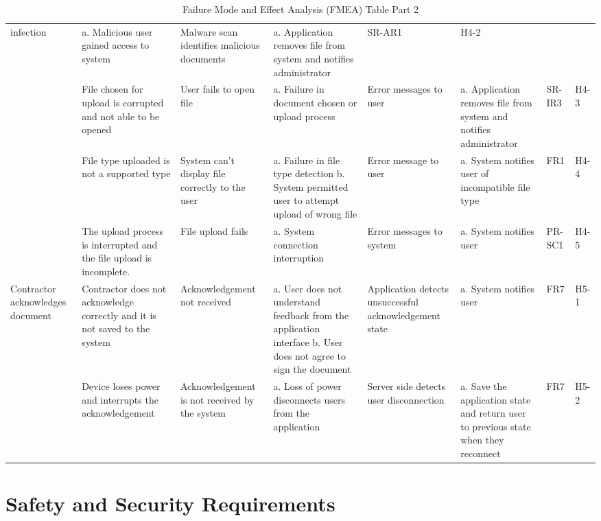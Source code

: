 \documentclass{article}
\begin{document}
\begin{table}[H]
{\begin{tabular}{|>{\raggedright}p{2.0cm}|>{\raggedright}p{2.0cm}|>{\raggedright}p{2.6cm}|>{\raggedright}p{4cm}|>{\raggedright}p{3cm}|>{\raggedright}p{4cm}|>{\raggedright}p{1.5cm}|p{1.5cm}|}
      infection &a. Malicious user gained access to system & Malware
      scan identifies malicious documents
      & a. Application removes file from system and notifies
      administrator & SR-AR1
      & H4-2 \\
      \cline{2-8}
      & File chosen for upload is corrupted and not able to be opened &
      User fails to open file &a. Failure in document chosen or upload process&
      Error messages to user& a. Application removes file from system and
      notifies administrator & SR-IR3 & H4-3 \\
      \cline{2-8}
      & File type uploaded is not a supported type & System can't display
      file correctly to the user & a. Failure in file type detection
      \newline b. System permitted user to attempt upload of wrong file &
      Error message to user& a. System notifies user of incompatible file type &
      FR1 & H4-4 \\
      \cline{2-8}
      & The upload process is interrupted and the file upload is incomplete. &
      File upload fails & a. System connection interruption &
      Error messages to system& a. System notifies user & PR-SC1 & H4-5\\
      \hline
      Contractor acknowledges document & Contractor does not acknowledge
      correctly and it is not saved to the system & Acknowledgement not received
      & a. User does not understand feedback from the application interface
      \newline b. User does not agree to sign the document & Application detects
      unsuccessful acknowledgement state & a. System notifies user &
      FR7 & H5-1 \\
      \cline{2-8}
      & Device loses power and interrupts the acknowledgement & Acknowledgement
      is not received by the system &
      a. Loss of power disconnects users from the application & Server side
      detects user disconnection & a. Save the application state and return
      user to previous state when they reconnect & FR7 & H5-2 \\
      \hline
    \end{tabular}
  }
  \caption{Failure Mode and Effect Analysis (FMEA) Table Part 2}
\end{table}

\section{Safety and Security Requirements}
\end{document}
